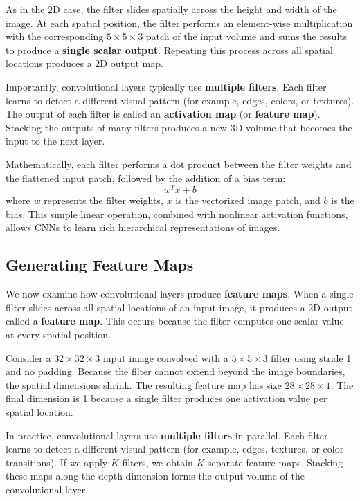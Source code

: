 \documentclass{article}
\begin{document}
As in the 2D case, the filter slides spatially across the height and width of the image. At each spatial position, the filter performs an element-wise multiplication with the corresponding $5\times5\times3$ patch of the input volume and sums the results to produce a \textbf{single scalar output}. Repeating this process across all spatial locations produces a 2D output map.

Importantly, convolutional layers typically use \textbf{multiple filters}. Each filter learns to detect a different visual pattern (for example, edges, colors, or textures). The output of each filter is called an \textbf{activation map} (or \textbf{feature map}). Stacking the outputs of many filters produces a new 3D volume that becomes the input to the next layer.

Mathematically, each filter performs a dot product between the filter weights and the flattened input patch, followed by the addition of a bias term:
\[
w^{T}x + b
\]
where $w$ represents the filter weights, $x$ is the vectorized image patch, and $b$ is the bias. This simple linear operation, combined with nonlinear activation functions, allows CNNs to learn rich hierarchical representations of images.

\subsection{Generating Feature Maps}

We now examine how convolutional layers produce \textbf{feature maps}. When a single filter slides across all spatial locations of an input image, it produces a 2D output called a \textbf{feature map}. This occurs because the filter computes one scalar value at every spatial position.

Consider a $32\times32\times3$ input image convolved with a $5\times5\times3$ filter using stride 1 and no padding. Because the filter cannot extend beyond the image boundaries, the spatial dimensions shrink. The resulting feature map has size $28\times28\times1$. The final dimension is 1 because a single filter produces one activation value per spatial location.

In practice, convolutional layers use \textbf{multiple filters} in parallel. Each filter learns to detect a different visual pattern (for example, edges, textures, or color transitions). If we apply $K$ filters, we obtain $K$ separate feature maps. Stacking these maps along the depth dimension forms the output volume of the convolutional layer.
\end{document}
